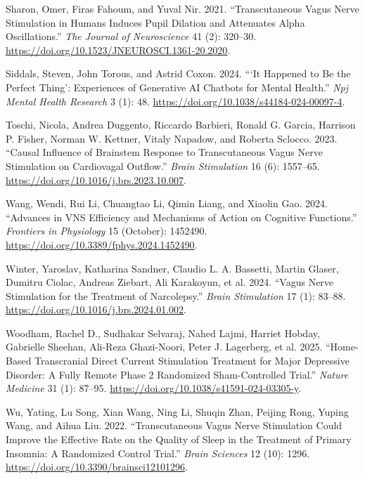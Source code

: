 \documentclass[
  Letterpaper,
]{scrbook}
\newlength{\cslhangindent}
\newenvironment{CSLReferences}[2] %
 {\begin{list}{}{%
  \setlength{\itemindent}{0pt}
  \setlength{\leftmargin}{0pt}
  \setlength{\parsep}{0pt}
  \ifodd #1
   \setlength{\leftmargin}{\cslhangindent}
   \setlength{\itemindent}{-1\cslhangindent}
  \fi
  \setlength{\itemsep}{#2\baselineskip}}}
 {\end{list}}
\begin{document}
\begin{CSLReferences}{1}{0}
Sharon, Omer, Firas Fahoum, and Yuval Nir. 2021. {``Transcutaneous
{Vagus Nerve Stimulation} in {Humans Induces Pupil Dilation} and
{Attenuates Alpha Oscillations}.''} \emph{The Journal of Neuroscience}
41 (2): 320--30. \url{https://doi.org/10.1523/JNEUROSCI.1361-20.2020}.

Siddals, Steven, John Torous, and Astrid Coxon. 2024. {``{`{It} Happened
to Be the Perfect Thing'}: Experiences of Generative {AI} Chatbots for
Mental Health.''} \emph{Npj Mental Health Research} 3 (1): 48.
\url{https://doi.org/10.1038/s44184-024-00097-4}.

Toschi, Nicola, Andrea Duggento, Riccardo Barbieri, Ronald G. Garcia,
Harrison P. Fisher, Norman W. Kettner, Vitaly Napadow, and Roberta
Sclocco. 2023. {``Causal Influence of Brainstem Response to
Transcutaneous Vagus Nerve Stimulation on Cardiovagal Outflow.''}
\emph{Brain Stimulation} 16 (6): 1557--65.
\url{https://doi.org/10.1016/j.brs.2023.10.007}.

Wang, Wendi, Rui Li, Chuangtao Li, Qimin Liang, and Xiaolin Gao. 2024.
{``Advances in {VNS} Efficiency and Mechanisms of Action on Cognitive
Functions.''} \emph{Frontiers in Physiology} 15 (October): 1452490.
\url{https://doi.org/10.3389/fphys.2024.1452490}.

Winter, Yaroslav, Katharina Sandner, Claudio L. A. Bassetti, Martin
Glaser, Dumitru Ciolac, Andreas Ziebart, Ali Karakoyun, et al. 2024.
{``Vagus Nerve Stimulation for the Treatment of Narcolepsy.''}
\emph{Brain Stimulation} 17 (1): 83--88.
\url{https://doi.org/10.1016/j.brs.2024.01.002}.

Woodham, Rachel D., Sudhakar Selvaraj, Nahed Lajmi, Harriet Hobday,
Gabrielle Sheehan, Ali-Reza Ghazi-Noori, Peter J. Lagerberg, et al.
2025. {``Home-Based Transcranial Direct Current Stimulation Treatment
for Major Depressive Disorder: A Fully Remote Phase 2 Randomized
Sham-Controlled Trial.''} \emph{Nature Medicine} 31 (1): 87--95.
\url{https://doi.org/10.1038/s41591-024-03305-y}.

Wu, Yating, Lu Song, Xian Wang, Ning Li, Shuqin Zhan, Peijing Rong,
Yuping Wang, and Aihua Liu. 2022. {``Transcutaneous {Vagus Nerve
Stimulation Could Improve} the {Effective Rate} on the {Quality} of
{Sleep} in the {Treatment} of {Primary Insomnia}: {A Randomized Control
Trial}.''} \emph{Brain Sciences} 12 (10): 1296.
\url{https://doi.org/10.3390/brainsci12101296}.


\end{CSLReferences}
\end{document}
